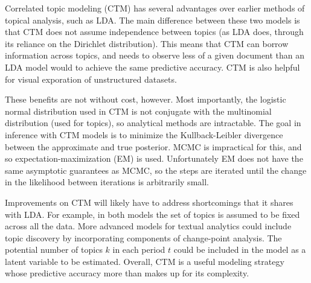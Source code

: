 \documentclass[12pt,letterpaper]{article}
\begin{document}




Correlated topic modeling (CTM) has several advantages over earlier methods of topical analysis, such as LDA. The main difference between these two models is that CTM does not assume independence between topics (as LDA does, through its reliance on the Dirichlet distribution). This means that CTM can borrow information across topics, and needs to observe less of a given document than an LDA model would to achieve the same predictive accuracy. CTM is also helpful for visual exporation of unstructured datasets. 

These benefits are not without cost, however. Most importantly, the logistic normal distribution used in CTM is not conjugate with the multinomial distribution (used for topics), so analytical methods are intractable. The goal in inference with CTM models is to minimize the Kullback-Leibler divergence between the approximate and true posterior. MCMC is impractical for this, and so expectation-maximization (EM) is used. Unfortunately EM does not have the same asymptotic guarantees as MCMC, so the steps are iterated until the change in the likelihood between iterations is arbitrarily small. 

Improvements on CTM will likely have to address shortcomings that it shares with LDA. For example, in both models the set of topics is assumed to be fixed across all the data. More advanced models for textual analytics could include topic discovery by incorporating components of change-point analysis. The potential number of topics $k$ in each period $t$ could be included in the model as a latent variable to be estimated. Overall, CTM is a useful modeling strategy whose predictive accuracy more than makes up for its complexity.





 
\end{document}
